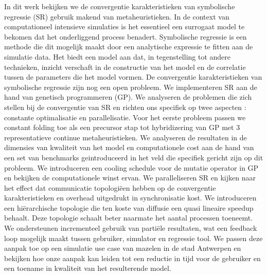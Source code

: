 In dit werk bekijken we de convergentie karakteristieken van symbolische regressie (SR) gebruik makend van metaheuristieken. In de context van computationeel intensieve simulaties is het essentieel een surrogaat model te bekomen dat het onderliggend process benadert. Symbolische regressie is een methode die dit mogelijk maakt door een analytische expressie te fitten aan de simulatie data. Het biedt een model aan dat, in tegenstelling tot andere technieken, inzicht verschaft in de constructie van het model en de correlatie tussen de parameters die het model vormen. De convergentie karakteristieken van symbolische regressie zijn nog een open probleem.
We implementeren SR aan de hand van genetisch programmeren (GP). We analyseren de problemen die zich stellen bij de convergentie van SR en richten ons specifiek op twee aspecten : constante optimalisatie en parallelisatie. Voor het eerste probleem passen we constant folding toe als een precursor stap tot hybridizering van GP met 3 representatieve continue metaheuristieken. We analyseren de resultaten in de dimensies van kwaliteit van het model en computationele cost aan de hand van een set van benchmarks geintroduceerd in het veld die specifiek gericht zijn op dit probleem. We introduceren een cooling schedule voor de mutatie operator in GP en bekijken de computationele winst ervan. 
We paralleliseren SR en kijken naar het effect dat communicatie topologiëen hebben op de convergentie karakteristieken en overhead uitgedrukt in synchronisatie kost. 
We introduceren een hiërarchische topologie die ten koste van diffusie een quasi lineaire speedup behaalt. Deze topologie schaalt beter naarmate het aantal processen toeneemt. We ondersteunen incrementeel gebruik van partiële resultaten, wat een feedback loop mogelijk maakt tussen gebruiker, simulator en regressie tool. We passen deze aanpak toe op een simulatie use case van mazelen in de stad Antwerpen en bekijken hoe onze aanpak kan leiden tot een reductie in tijd voor de gebruiker en een toename in kwaliteit van het resulterende model.